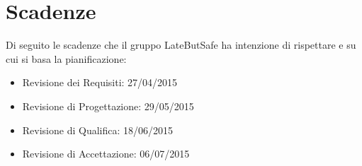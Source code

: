 \section{Scadenze}

Di seguito le scadenze che il gruppo LateButSafe ha intenzione di rispettare e su cui si basa la pianificazione:

\begin{itemize}

\item Revisione dei Requisiti: 27/04/2015
\item Revisione di Progettazione: 29/05/2015
\item Revisione di Qualifica: 18/06/2015
\item Revisione di Accettazione: 06/07/2015

\end{itemize}

